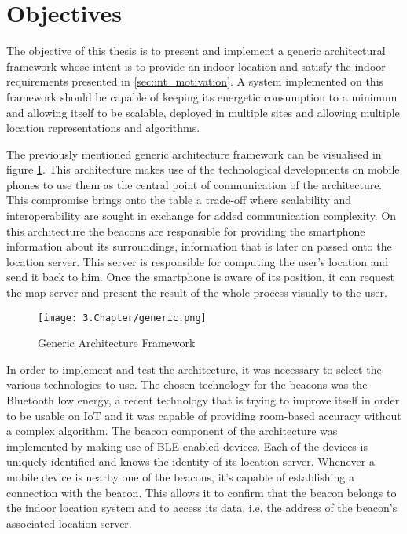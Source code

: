 \section{Objectives} 
\label{sec:objectives} 
 
 
The objective of this thesis is to present and implement a generic architectural framework whose intent is to provide an indoor location and satisfy the indoor requirements presented in \ref{sec:int_motivation}. A system implemented on this framework should be capable of keeping its energetic consumption to a minimum and allowing itself to be scalable, deployed in multiple sites and allowing multiple location representations and algorithms. 
 
  
The previously mentioned generic architecture framework can be visualised in figure \ref{fig:solution}. This architecture makes use of the technological developments on mobile phones to use them as the central point of communication of the architecture. This compromise brings onto the table a trade-off where scalability and interoperability are sought in exchange for added communication complexity. On this architecture the beacons are responsible for providing the smartphone information about its surroundings, information that is later on passed onto the location server. This server is responsible for computing the user's location and send it back to him. Once the smartphone is aware of its position, it can request the map server and present the result of the whole process visually to the user. 
 

 \begin{figure}[H] 
\centering 
\texttt{[image: 3.Chapter/generic.png]} 
\caption[Generic Architecture Framework]{Generic Architecture Framework } 
\label{fig:solution} 
\end{figure} 
  
 
In order to implement and test the architecture, it was necessary to select the various technologies to use. The chosen technology for the beacons was the Bluetooth low energy, a recent technology that is trying to improve itself in order to be usable on \ac{IoT} and it was capable of providing room-based accuracy without a complex algorithm. The beacon component of the architecture was implemented by making use of \ac{BLE} enabled devices. Each of the devices is uniquely identified and knows the identity of its location server. Whenever a mobile device is nearby one of the beacons, it's capable of establishing a connection with the beacon. This allows it to confirm that the beacon belongs to the indoor location system and to access its data, i.e. the address of the beacon's associated location server. 
 
